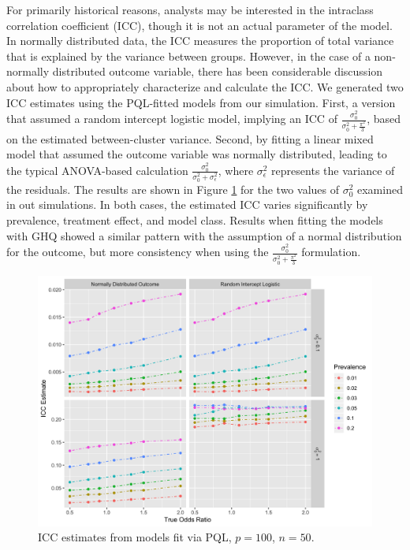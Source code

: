 \documentclass{article}
\begin{document}
\begin{flushleft}
For primarily historical reasons, analysts may be interested in the intraclass correlation coefficient (ICC), though it is not an actual parameter of the model. In normally distributed data, the ICC measures the proportion of total variance that is explained by the variance between groups. However, in the case of a non-normally distributed outcome variable, there has been considerable discussion about how to appropriately characterize and calculate the ICC\cite{wu_comparison_2012}\cite{nakagawa_shinichi_coefficient_2017}. We generated two ICC estimates using the PQL-fitted models from our simulation.  First, a version that assumed a random intercept logistic model, implying an ICC of $\frac{\sigma^2_0}{\sigma^2_0+\frac{\pi^2}{3}}$, based on the estimated between-cluster variance. Second, by fitting a linear mixed model that assumed the outcome variable was normally distributed, leading to the typical ANOVA-based calculation $\frac{\sigma^2_0}{\sigma^2_0+\sigma^2_{\epsilon}}$, where $\sigma^2_{\epsilon}$ represents the variance of the residuals. The results are shown in Figure \ref{fig:_icc} for the two values of $\sigma^2_0$ examined in out simulations. In both cases, the estimated ICC varies significantly by prevalence, treatment effect, and model class. Results when fitting the models with GHQ showed a similar pattern with the assumption of a normal distribution for the outcome, but more consistency when using the $\frac{\sigma^2_0}{\sigma^2_0+\frac{\pi^2}{3}}$ formulation. 

\begin{figure}[]
\begin{center}
\includegraphics[width=12cm]{_icc_p100_n50.png}
  \caption{ICC estimates from models fit via PQL, $p=100$, $n=50$.}
    \label{fig:_icc}
\end{center}
\end{figure}



\end{flushleft}
\end{document}
